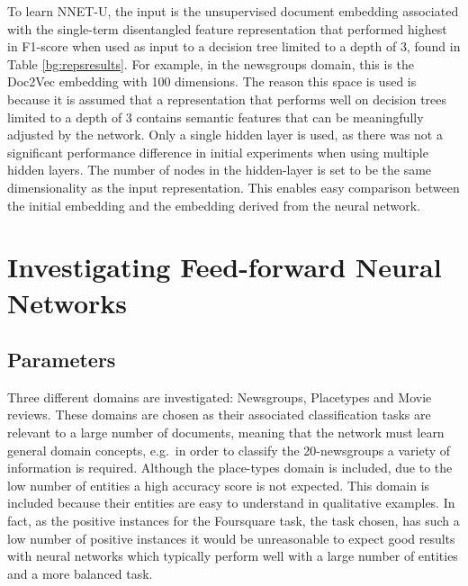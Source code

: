 To learn NNET-U, the input is the unsupervised document embedding associated with the single-term disentangled feature representation that performed highest in F1-score when used as input to a  decision tree limited to a depth of 3,  found in Table \ref{bg:repsresults}. For example, in the newsgroups domain, this is the Doc2Vec embedding with 100 dimensions. The reason this space is used is because it is assumed that a representation that performs well on  decision trees limited to a depth of 3 contains semantic features that can be meaningfully adjusted by the network. Only a single hidden layer is used, as there was not a significant performance difference in initial experiments when using multiple hidden layers. The number of nodes in the hidden-layer is set to be the same dimensionality as the input representation. This enables easy comparison between the initial  embedding and the embedding derived from the neural network.










\section{Investigating Feed-forward Neural Networks}\label{ch5:results}

\subsection{Parameters}

Three different domains are investigated: Newsgroups, Placetypes and Movie reviews. These domains are chosen as their  associated classification tasks are relevant to a large number of documents, meaning that the network must learn general domain concepts, e.g.\ in order to classify the 20-newsgroups a variety  of information is required. Although the place-types domain is included, due to the low number of entities a high accuracy score is not expected. This domain is included  because their entities are easy to understand in qualitative examples. In fact, as the positive instances for the Foursquare task, the task chosen, has such a low number of positive instances it would be unreasonable to expect good results with neural networks which typically perform well with a large number of entities and a more balanced task.

